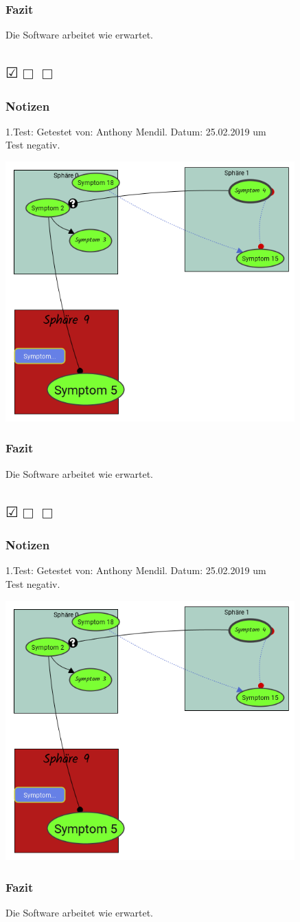 \documentclass{scrartcl}
\newcommand{\subsectiont}[2]{\subsection[#1]{#1{\normalsize\normalfont #2}}}
\newcommand{\leer}{$\Box$}
\newcommand{\ok}{$\CheckedBox$}
\begin{document}
\subsubsection{Fazit}
Die Software arbeitet wie erwartet.

\subsectiont{}{\dotfill\ok\leer\leer}
\subsubsection{Notizen}
1.Test: Getestet von: Anthony Mendil. Datum: 25.02.2019 um  \\
Test negativ. 
\begin{center}
\includegraphics[height=10cm]{3_42.PNG}
\end{center}
\subsubsection{Fazit}
Die Software arbeitet wie erwartet.

\subsectiont{}{\dotfill\ok\leer\leer}
\subsubsection{Notizen}
1.Test: Getestet von: Anthony Mendil. Datum: 25.02.2019 um  \\
Test negativ. 
\begin{center}
\includegraphics[height=10cm]{3_42.PNG}
\end{center}
\subsubsection{Fazit}
Die Software arbeitet wie erwartet.
\end{document}
